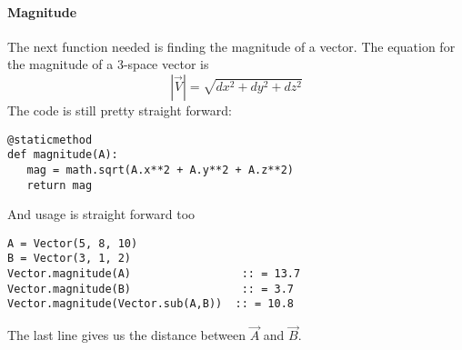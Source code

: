 \documentclass[15pt]{report}
\begin{document}
\paragraph{Magnitude} The next function needed is finding the magnitude of a vector. The equation for the magnitude of a 3-space vector is 
\begin{equation}
\left| \vec{V} \right|  = \sqrt{dx^2 + dy^2 + dz^2}
\end{equation}
The code is still pretty straight forward:
\begin{lstlisting}
@staticmethod
def magnitude(A):
   mag = math.sqrt(A.x**2 + A.y**2 + A.z**2)
   return mag
\end{lstlisting}
And usage is straight forward too
\begin{lstlisting}
A = Vector(5, 8, 10)
B = Vector(3, 1, 2)
Vector.magnitude(A)                 :: = 13.7
Vector.magnitude(B)                 :: = 3.7
Vector.magnitude(Vector.sub(A,B))  :: = 10.8
\end{lstlisting}
The last line gives us the distance between $\vec{A}$ and $\vec{B}$.
\printbibliography
\end{document}
